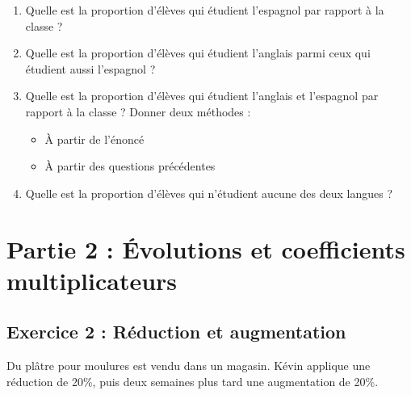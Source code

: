 \documentclass[12pt,a4paper]{article}
\begin{document}
\begin{enumerate}
    \item Quelle est la proportion d'élèves qui étudient l’espagnol par rapport à la classe ?\\
    \begin{tcolorbox}[colframe=black, colback=white, width=\linewidth, height=3cm]
    \end{tcolorbox}

    \item Quelle est la proportion d’élèves qui étudient l’anglais parmi ceux qui étudient aussi l’espagnol ?\\
    \begin{tcolorbox}[colframe=black, colback=white, width=\linewidth, height=3cm]
    \end{tcolorbox}

    \item Quelle est la proportion d’élèves qui étudient l’anglais et l’espagnol par rapport à la classe ? Donner deux méthodes :
    \begin{itemize}
        \item À partir de l’énoncé
        \item À partir des questions précédentes
    \end{itemize}
    \begin{tcolorbox}[colframe=black, colback=white, width=\linewidth, height=5cm]
    \end{tcolorbox}

    \item Quelle est la proportion d’élèves qui n’étudient aucune des deux langues ?\\
    \begin{tcolorbox}[colframe=black, colback=white, width=\linewidth, height=3cm]
    \end{tcolorbox}
\end{enumerate}

\section*{Partie 2 : Évolutions et coefficients multiplicateurs}

\subsection*{Exercice 2 : Réduction et augmentation}

Du plâtre pour moulures est vendu dans un magasin. Kévin applique une réduction de 20\%, puis deux semaines plus tard une augmentation de 20\%.
\end{document}
